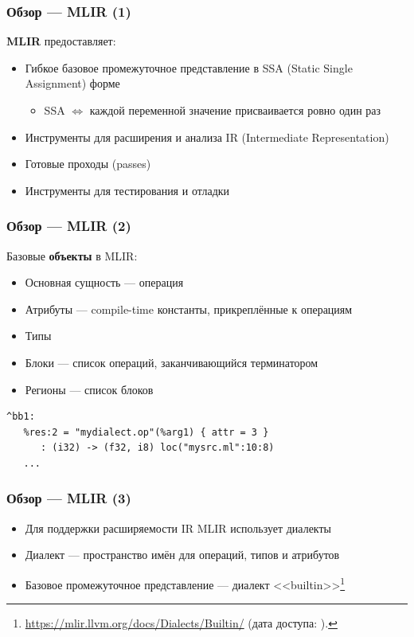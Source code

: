 \documentclass{beamer}
\begin{document}
\begin{frame}
	\frametitle{Обзор --- MLIR (1)}
	\textbf{MLIR} предоставляет:
	\begin{itemize}
		\item Гибкое базовое промежуточное представление в SSA (Static Single Assignment) форме
		      \begin{itemize}
			      \item SSA $\Leftrightarrow$ каждой переменной значение присваивается ровно один раз
		      \end{itemize}
		\item Инструменты для расширения и анализа IR (Intermediate Representation)
		\item Готовые проходы (passes)
		\item Инструменты для тестирования и отладки
	\end{itemize}
\end{frame}

\begin{frame}[fragile]
	\frametitle{Обзор --- MLIR (2)}
	Базовые \textbf{объекты} в MLIR:

	\begin{itemize}
		\item Основная сущность --- операция
		\item Атрибуты --- compile-time константы, прикреплённые к операциям
		\item Типы
		\item Блоки --- список операций, заканчивающийся терминатором
		\item Регионы --- список блоков
	\end{itemize}

	\begin{lstlisting}[caption = {Пример операции}, frame=single]
^bb1:
   %res:2 = "mydialect.op"(%arg1) { attr = 3 }
      : (i32) -> (f32, i8) loc("mysrc.ml":10:8)
   ...
\end{lstlisting}

\end{frame}

\begin{frame}[fragile]
	\frametitle{Обзор --- MLIR (3)}
	\begin{itemize}
		\item Для поддержки расширяемости IR MLIR использует диалекты
		\item Диалект --- пространство имён для операций, типов и атрибутов
		\item Базовое промежуточное представление --- диалект <<builtin>>\footnote{\url{https://mlir.llvm.org/docs/Dialects/Builtin/} (дата доступа:   ).}
	\end{itemize}
\end{frame}
\end{document}
